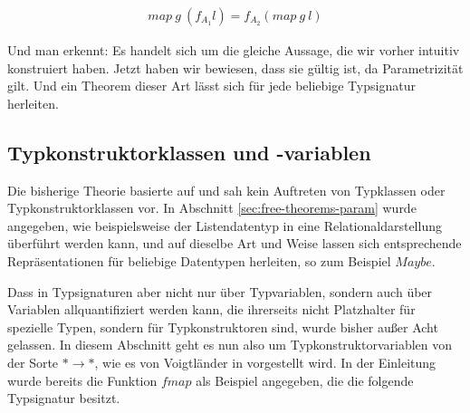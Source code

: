 \begin{align*}
map\ g\ (f_{A_1} l) = f_{A_2} (map\ g\ l)
\end{align*}

Und man erkennt: Es handelt sich um die gleiche Aussage, die wir vorher intuitiv konstruiert haben. Jetzt haben wir bewiesen,
dass sie gültig ist, da Parametrizität gilt. Und ein Theorem dieser Art lässt sich für jede beliebige Typsignatur herleiten.


\subsection{Typkonstruktorklassen und -variablen}

\label{sec:typkonstruktorklassen}

Die bisherige Theorie basierte auf \cite{wadler} und sah kein Auftreten von Typklassen oder Typkonstruktorklassen vor.
In Abschnitt \ref{sec:free-theorems-param} wurde angegeben, wie beispielsweise der Listendatentyp in eine Relationaldarstellung
überführt werden kann, und auf dieselbe Art und Weise lassen sich entsprechende Repräsentationen für beliebige Datentypen
herleiten, so zum Beispiel $Maybe$.

Dass in Typsignaturen aber nicht nur über Typvariablen, sondern auch über Variablen allquantifiziert werden kann, die
ihrerseits nicht Platzhalter für spezielle Typen, sondern für Typkonstruktoren sind, wurde bisher außer Acht gelassen. In diesem
Abschnitt geht es nun also um Typkonstruktorvariablen von der Sorte $* \rightarrow *$, wie es von Voigtländer in \cite{voigtlander}
vorgestellt wird. In der Einleitung wurde bereits die Funktion $fmap$ als Beispiel angegeben, die die folgende Typsignatur besitzt.



